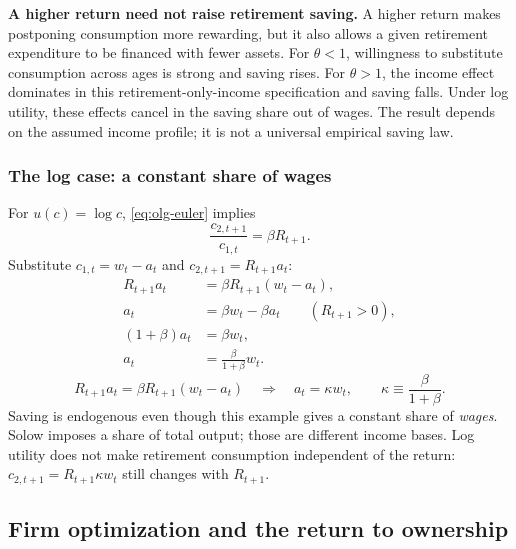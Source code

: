 \begin{greenblock}
\textbf{A higher return need not raise retirement saving.}
A higher return makes postponing consumption more rewarding, but it also
allows a given retirement expenditure to be financed with fewer assets.
For $\theta<1$, willingness to substitute consumption across ages is strong
and saving rises. For $\theta>1$, the income effect dominates in this
retirement-only-income specification and saving falls. Under log utility,
these effects cancel in the saving share out of wages. The result depends
on the assumed income profile; it is not a universal empirical saving law.
\end{greenblock}

\subsubsection{The log case: a constant share of wages}

For $u(c)=\log c$, \eqref{eq:olg-euler} implies
\begin{equation}
\frac{c_{2,t+1}}{c_{1,t}}=\beta R_{t+1}.
\end{equation}
Substitute $c_{1,t}=w_t-a_t$ and $c_{2,t+1}=R_{t+1}a_t$:
\begin{align}
R_{t+1}a_t&=\beta R_{t+1}(w_t-a_t),\\
a_t&=\beta w_t-\beta a_t\qquad(R_{t+1}>0),\\
(1+\beta)a_t&=\beta w_t,\\
a_t&=\frac{\beta}{1+\beta}w_t.
\end{align}
\begin{equation}\label{eq:olg-log-saving}
R_{t+1}a_t=\beta R_{t+1}(w_t-a_t)
\quad\Longrightarrow\quad
 a_t=\kappa w_t,\qquad \kappa\equiv\frac{\beta}{1+\beta}.
\end{equation}
Saving is endogenous even though this example gives a constant share of
\emph{wages}. Solow imposes a share of total output; those are different
income bases. Log utility does not make retirement consumption independent
of the return: $c_{2,t+1}=R_{t+1}\kappa w_t$ still changes with $R_{t+1}$.

\subsection{Firm optimization and the return to ownership}

